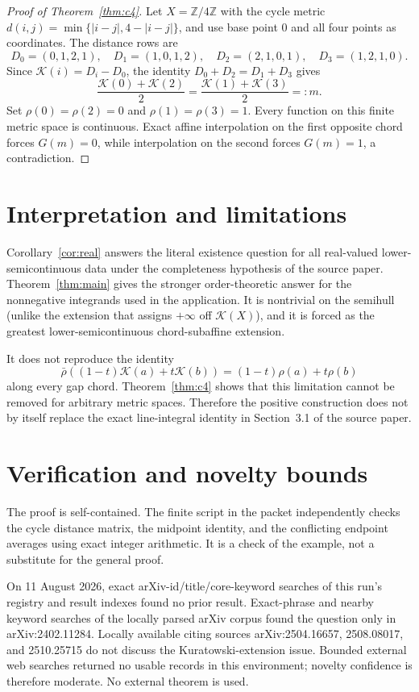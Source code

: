 \documentclass[11pt]{article}
\newcommand{\K}{\mathcal K}
\begin{document}
\begin{proof}[Proof of Theorem~\ref{thm:c4}]
Let $X=\mathbb Z/4\mathbb Z$ with the cycle metric
$d(i,j)=\min\{|i-j|,4-|i-j|\}$, and use base point $0$ and all four points as
coordinates.  The distance rows are
\[
 D_0=(0,1,2,1),\quad D_1=(1,0,1,2),\quad
 D_2=(2,1,0,1),\quad D_3=(1,2,1,0).
\]
Since $\K(i)=D_i-D_0$, the identity $D_0+D_2=D_1+D_3$ gives
\[
 \frac{\K(0)+\K(2)}2=\frac{\K(1)+\K(3)}2=:m.
\]
Set $\rho(0)=\rho(2)=0$ and $\rho(1)=\rho(3)=1$.  Every function on this
finite metric space is continuous.  Exact affine interpolation on the first
opposite chord forces $G(m)=0$, while interpolation on the second forces
$G(m)=1$, a contradiction.
\end{proof}

\section{Interpretation and limitations}

Corollary~\ref{cor:real} answers the literal existence question for all
real-valued lower-semicontinuous data under the completeness hypothesis of the
source paper.  Theorem~\ref{thm:main} gives the stronger order-theoretic answer
for the nonnegative integrands used in the application.  It is nontrivial on
the semihull (unlike the extension that assigns $+\infty$ off $\K(X)$), and it
is forced as the greatest lower-semicontinuous chord-subaffine extension.

It does not reproduce the identity
\[
 \bar\rho((1-t)\K(a)+t\K(b))=(1-t)\rho(a)+t\rho(b)
\]
along every gap chord.  Theorem~\ref{thm:c4} shows that this limitation cannot
be removed for arbitrary metric spaces.  Therefore the positive construction
does not by itself replace the exact line-integral identity in Section~3.1 of
the source paper.

\section{Verification and novelty bounds}

The proof is self-contained.  The finite script in the packet independently
checks the cycle distance matrix, the midpoint identity, and the conflicting
endpoint averages using exact integer arithmetic.  It is a check of the
example, not a substitute for the general proof.

On 11 August 2026, exact arXiv-id/title/core-keyword searches of this run's
registry and result indexes found no prior result.  Exact-phrase and nearby
keyword searches of the locally parsed arXiv corpus found the question only
in arXiv:2402.11284.  Locally available citing sources arXiv:2504.16657,
2508.08017, and 2510.25715 do not discuss the Kuratowski-extension issue.
Bounded external web searches returned no usable records in this environment;
novelty confidence is therefore moderate.  No external theorem is used.
\end{document}
